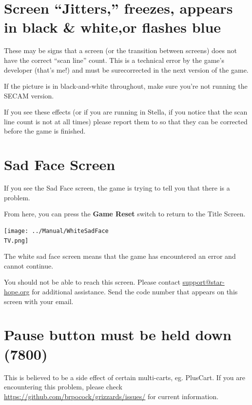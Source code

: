 \documentclass[10pt,twocolumn,openany,article]{memoir}
\newcommand\TV{NTSC}
\newcommand\TV{PAL}
\newcommand\TV{SECAM}
\begin{document}
\section{Screen ``Jitters,'' freezes,  \ifdefined\TVPAL appears in black
  \& white,\fi or flashes blue}

These may  be signs that  a screen  (or the transition  between screens)
does not have the correct ``scan line'' count. This is a technical error
by the game's  developer (that's me!) and must be  surecorrected in the next
version of the game.

\ifdefined\TVPAL
If the  picture is in  black-and-white throughout, make sure  you're not
running the SECAM version.
\fi

If you see these effects (or if you are running in Stella, if you notice
that the scan  line count is not \ifdefined{}   \fi at
all         times)         please         report         them         to
 so  that they
can be corrected before the game is finished.

\fi

\section{Sad Face Screen}

If you  see the Sad  Face screen,  the game is  trying to tell  you that
there is a problem.

From here, you can press the \textbf{Game Reset} switch to return to the
Title Screen.

\ifdefined\PLUSCART\else

\texttt{[image: ../Manual/WhiteSadFace\\TV.png]}

The white sad  face screen means that the game  has encountered an error
and cannot continue. 

You  should   not  be  able   to  reach  this  screen.   Please  contact
\href{mailto:support@star-hope.org}{support@star-hope.org}           for
additional assistance. Send the code  number that appears on this screen
with your email.

\section{Pause button must be held down (7800)}

This  is believed  to  be  a side  effect  of  certain multi-carts,  eg.
PlusCart.   If  you   are  encountering   this  problem,   please  check
\href{https://github.com/brpocock/grizzards/issues/182}{https://\-github.com/\-brpocock/\-grizzards/\-issues/}
for current information.
\end{document}
